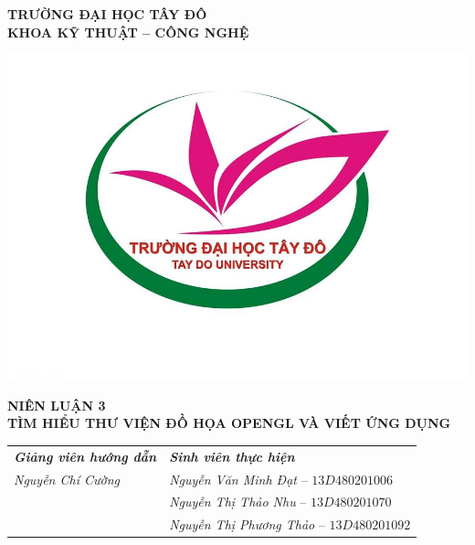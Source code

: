 
	\begin{center}	
	\newcommand{\HRule}{\rule{.3\linewidth}{0.5mm}}
	\vspace{-1.5cm}
	\begin{center}
{\large \textbf{TRƯỜNG ĐẠI HỌC TÂY ĐÔ\vspace{.2cm}\\KHOA KỸ THUẬT -- CÔNG NGHỆ\\\vspace{1.0cm}}}
	\end{center}
	\includegraphics[width=.55\textwidth]{logo_tdu.jpg}\par\vspace{1.0cm}
	{\LARGE \textbf{NIÊN LUẬN 3} \vspace{.5cm} \\  \textbf{TÌM HIỂU THƯ VIỆN ĐỒ HỌA OPENGL VÀ VIẾT ỨNG DỤNG}\par}%
	\vspace{2cm}
	
	\begin{tabular}{ll}
	{\large \textbf{\textit{Giảng viên hướng dẫn}}} & {\qquad \large \textbf{\textit{Sinh viên thực hiện}}}\vspace{.3cm}\\
	{\large \textit{Nguyễn Chí Cường}} & {\qquad \large \textit{Nguyễn Văn Minh Đạt} \hspace{0.7cm}-- $13D480201006$} \vspace{.2cm}\\
	 & {\qquad \large \textit{Nguyễn Thị Thảo Nhu} \hspace{.8cm}-- $13D480201070$} \vspace{.2cm}\\	
	  & {\qquad \large \textit{Nguyễn Thị Phương Thảo} -- $13D480201092$} \vspace{.2cm}\\
	\end{tabular}
	

\end{center}
